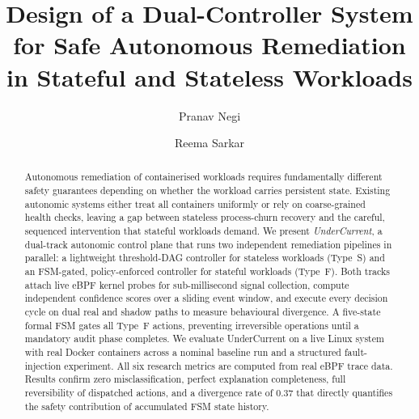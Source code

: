 \documentclass[runningheads]{llncs}
\begin{document}
\title{Design of a Dual-Controller System for Safe Autonomous Remediation in Stateful and Stateless Workloads}


\author{Pranav Negi \and Reema Sarkar}



\maketitle

\begin{abstract}
Autonomous remediation of containerised workloads requires fundamentally
different safety guarantees depending on whether the workload carries
persistent state. Existing autonomic systems either treat all containers
uniformly or rely on coarse-grained health checks, leaving a gap between
stateless process-churn recovery and the careful, sequenced intervention
that stateful workloads demand. We present \textit{UnderCurrent}, a
dual-track autonomic control plane that runs two independent
remediation pipelines in parallel: a lightweight threshold-DAG controller
for stateless workloads (Type~S) and an FSM-gated, policy-enforced
controller for stateful workloads (Type~F). Both tracks attach live
eBPF kernel probes for sub-millisecond signal collection, compute
independent confidence scores over a sliding event window, and execute
every decision cycle on dual real and shadow paths to measure
behavioural divergence. A five-state formal FSM gates all Type~F
actions, preventing irreversible operations until a mandatory audit
phase completes. We evaluate UnderCurrent on a live Linux system with
real Docker containers across a nominal baseline run and a structured
fault-injection experiment. All six research metrics are computed
from real eBPF trace data. Results confirm zero misclassification,
perfect explanation completeness, full reversibility of dispatched
actions, and a divergence rate of 0.37 that directly quantifies the
safety contribution of accumulated FSM state history.
\end{abstract}
\end{document}
